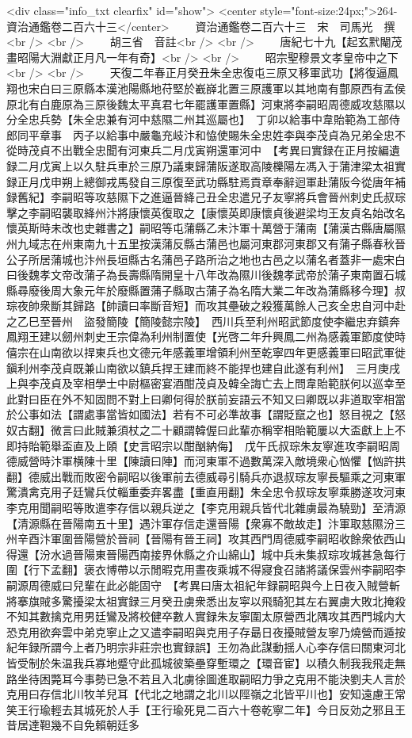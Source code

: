 <div class="info_txt clearfix" id="show">
<center style="font-size:24px;">264-資治通鑑卷二百六十三</center>
  　　資治通鑑卷二百六十三　宋　司馬光　撰<br />
<br />
　　胡三省　音註<br />
<br />
　　唐紀七十九【起玄黓閹茂畫昭陽大淵獻正月凡一年有奇】<br />
<br />
　　昭宗聖穆景文孝皇帝中之下<br />
<br />
　　天復二年春正月癸丑朱全忠復屯三原又移軍武功【將復逼鳳翔也宋白曰三原縣本漢池陽縣地苻堅於嶻嶭北置三原護軍以其地南有鄷原西有孟侯原北有白鹿原為三原後魏太平真君七年罷護軍置縣】河東將李嗣昭周德威攻慈隰以分全忠兵勢【朱全忠兼有河中慈隰二州其巡屬也】　丁卯以給事中韋貽範為工部侍郎同平章事　丙子以給事中嚴龜充岐汴和恊使賜朱全忠姓李與李茂貞為兄弟全忠不從時茂貞不出戰全忠聞有河東兵二月戊寅朔還軍河中　【考異曰實録在正月按編遺録二月戊寅上以久駐兵車於三原乃議東歸蒲阪遂取高陵櫟陽左馮入于蒲津梁太祖實録正月戊申朔上總御戎馬發自三原復至武功縣駐焉貢章奉辭迴軍赴蒲阪今從唐年補録舊紀】李嗣昭等攻慈隰下之進逼晉絳己丑全忠遣兄子友寧將兵會晉州刺史氏叔琮擊之李嗣昭襲取絳州汴將康懷英復取之【康懷英即康懷貞後避梁均王友貞名始改名懷英斯時未改也史雜書之】嗣昭等屯蒲縣乙未汴軍十萬營于蒲南【蒲漢古縣唐屬隰州九域志在州東南九十五里按漢蒲反縣古蒲邑也屬河東郡河東郡又有蒲子縣春秋晉公子所居蒲城也汴州長垣縣古名蒲邑子路所治之地也古邑之以蒲名者蓋非一處宋白曰後魏孝文帝改蒲子為長壽縣隋開皇十八年改為隰川後魏孝武帝於蒲子東南置石城縣尋廢後周大象元年於廢縣置蒲子縣取古蒲子為名隋大業二年改為蒲縣移今理】叔琮夜帥衆斷其歸路【帥讀曰率斷音短】而攻其壘破之殺獲萬餘人己亥全忠自河中赴之乙巳至晉州　盜發簡陵【簡陵懿宗陵】　西川兵至利州昭武節度使李繼忠弃鎮奔鳳翔王建以劒州刺史王宗偉為利州制置使【光啓二年升興鳳二州為感義軍節度使時僖宗在山南欲以捍東兵也文德元年感義軍增領利州至乾寧四年更感義軍曰昭武軍徙鎭利州李茂貞既兼山南欲以鎮兵捍王建而終不能捍也建自此遂有利州】　三月庚戌上與李茂貞及宰相學士中尉樞密宴酒酣茂貞及韓全誨亡去上問韋貽範朕何以巡幸至此對曰臣在外不知固問不對上曰卿何得於朕前妄語云不知又曰卿既以非道取宰相當於公事如法【謂處事當皆如國法】若有不可必準故事【謂貶竄之也】怒目視之【怒奴古翻】微言曰此賊兼須杖之二十顧謂韓偓曰此輩亦稱宰相貽範屢以大盃獻上上不即持貽範舉盃直及上頤【史言昭宗以酣酗納侮】　戊午氏叔琮朱友寧進攻李嗣昭周德威營時汴軍横陳十里【陳讀曰陣】而河東軍不過數萬深入敵境衆心忷懼【忷許拱翻】德威出戰而敗密令嗣昭以後軍前去德威尋引騎兵亦退叔琮友寧長驅乘之河東軍驚潰禽克用子廷鸞兵仗輜重委弃畧盡【重直用翻】朱全忠令叔琮友寧乘勝遂攻河東李克用聞嗣昭等敗遣李存信以親兵逆之【李克用親兵皆代北雜虜最為驍勁】至清源【清源縣在晉陽南五十里】遇汴軍存信走還晉陽【衆寡不敵故走】汴軍取慈隰汾三州辛酉汴軍圍晉陽營於晉祠【晉陽有晉王祠】攻其西門周德威李嗣昭收餘衆依西山得還【汾水過晉陽東晉陽西南接界休縣之介山綿山】城中兵未集叔琮攻城甚急每行圍【行下孟翻】褒衣博帶以示閒暇克用晝夜乘城不得寢食召諸將議保雲州李嗣昭李嗣源周德威曰兒輩在此必能固守　【考異曰唐太祖紀年録嗣昭與今上日夜入賊營斬將搴旗賊多驚擾梁太祖實録三月癸丑虜衆悉出友寜以飛騎犯其左右翼虜大敗北掩殺不知其數擒克用男廷鸞及將校健卒數人實録朱友寧圍太原營西北隅攻其西門城内大恐克用欲奔雲中弟克寧止之又遣李嗣昭與克用子存朂日夜擾賊營友寧乃燒營而遁按紀年録所謂今上者乃明宗非莊宗也實録誤】王勿為此謀動揺人心李存信曰關東河北皆受制於朱温我兵寡地蹙守此孤城彼築壘穿塹環之【環音宦】以積久制我我飛走無路坐待困斃耳今事勢已急不若且入北虜徐圖進取嗣昭力爭之克用不能決劉夫人言於克用曰存信北川牧羊兒耳【代北之地謂之北川以陘嶺之北皆平川也】安知遠慮王常笑王行瑜輕去其城死於人手【王行瑜死見二百六十卷乾寧二年】今日反効之邪且王昔居達靼幾不自免賴朝廷多